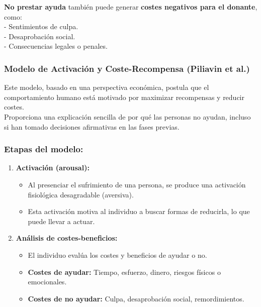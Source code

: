 \documentclass[
]{book}
\providecommand{\tightlist}{%
  \setlength{\itemsep}{0pt}\setlength{\parskip}{0pt}}
\begin{document}
\textbf{No prestar ayuda} también puede generar \textbf{costes negativos para el donante}, como:\\
- Sentimientos de culpa.\\
- Desaprobación social.\\
- Consecuencias legales o penales.

\subsubsection{Modelo de Activación y Coste-Recompensa (Piliavin et al.)}\label{modelo-de-activaciuxf3n-y-coste-recompensa-piliavin-et-al.}

Este modelo, basado en una perspectiva económica, postula que el comportamiento humano está motivado por maximizar recompensas y reducir costes.\\
Proporciona una explicación sencilla de por qué las personas no ayudan, incluso si han tomado decisiones afirmativas en las fases previas.

\subsubsection{Etapas del modelo:}\label{etapas-del-modelo}

\begin{enumerate}
\def\labelenumi{\arabic{enumi}.}
\tightlist
\item
  \textbf{Activación (arousal):}

  \begin{itemize}
  \tightlist
  \item
    Al presenciar el sufrimiento de una persona, se produce una activación fisiológica desagradable (aversiva).
  \item
    Esta activación motiva al individuo a buscar formas de reducirla, lo que puede llevar a actuar.
  \end{itemize}
\item
  \textbf{Análisis de costes-beneficios:}

  \begin{itemize}
  \tightlist
  \item
    El individuo evalúa los costes y beneficios de ayudar o no.
  \item
    \textbf{Costes de ayudar:} Tiempo, esfuerzo, dinero, riesgos físicos o emocionales.
  \item
    \textbf{Costes de no ayudar:} Culpa, desaprobación social, remordimientos.
  \end{itemize}
\end{enumerate}
\end{document}
